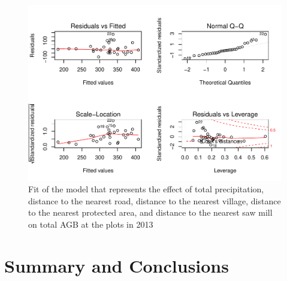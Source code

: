 \documentclass[12pt,]{article}
\begin{document}
\begin{figure}
\centering
\includegraphics{Project_Template_files/figure-latex/modelfit-1.pdf}
\caption{Fit of the model that represents the effect of total
precipitation, distance to the nearest road, distance to the nearest
village, distance to the nearest protected area, and distance to the
nearest saw mill on total AGB at the plots in 2013}
\end{figure}

\newpage

\hypertarget{summary-and-conclusions}{%
\section{Summary and Conclusions}\label{summary-and-conclusions}}
\end{document}
